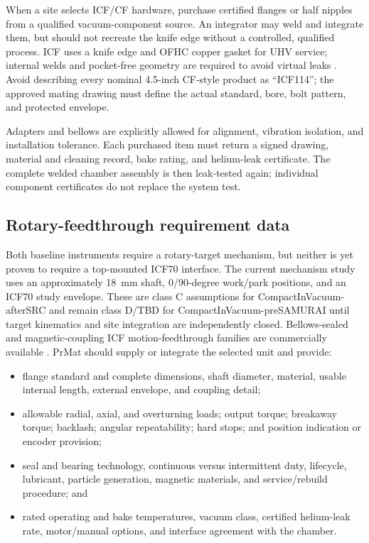 \documentclass[10pt,letterpaper]{article}
\begin{document}
When a site selects ICF/CF hardware, purchase certified flanges or half nipples from a
qualified vacuum-component source. An integrator may weld and integrate them, but should
not recreate the knife edge without a controlled, qualified process. ICF uses a knife edge
and OFHC copper gasket for UHV service; internal welds and pocket-free geometry are required
to avoid virtual leaks \cite{cosmotec_icf_standard,leybold_cf_hardware}. Avoid describing
every nominal 4.5-inch CF-style product as \enquote{ICF114}; the approved mating drawing
must define the actual standard, bore, bolt pattern, and protected envelope.

Adapters and bellows are explicitly allowed for alignment, vibration isolation, and
installation tolerance. Each purchased item must return a signed drawing, material and
cleaning record, bake rating, and helium-leak certificate. The complete welded chamber
assembly is then leak-tested again; individual component certificates do not replace the
system test.

\subsection{Rotary-feedthrough requirement data}

Both baseline instruments require a rotary-target mechanism, but neither is yet proven to
require a top-mounted ICF70 interface. The current mechanism study uses an approximately
\SI{18}{\milli\meter} shaft, 0/90-degree work/park positions, and an ICF70 study envelope.
These are class C assumptions for CompactInVacuum-afterSRC and remain class D/TBD for
CompactInVacuum-preSAMURAI until target kinematics and site integration are independently
closed.
Bellows-sealed and magnetic-coupling ICF motion-feedthrough families are commercially
available \cite{cosmotec_motion_feedthrough}. PrMat should supply or integrate the selected
unit and provide:
\begin{itemize}
  \item flange standard and complete dimensions, shaft diameter, material, usable internal
    length, external envelope, and coupling detail;
  \item allowable radial, axial, and overturning loads; output torque; breakaway torque;
    backlash; angular repeatability; hard stops; and position indication or encoder provision;
  \item seal and bearing technology, continuous versus intermittent duty, lifecycle,
    lubricant, particle generation, magnetic materials, and service/rebuild procedure; and
  \item rated operating and bake temperatures, vacuum class, certified helium-leak rate,
    motor/manual options, and interface agreement with the chamber.
\end{itemize}
\end{document}
